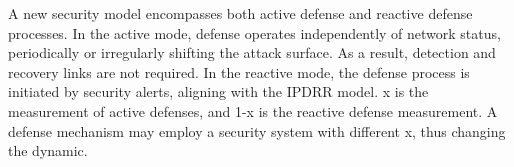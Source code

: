 A new security model encompasses both active defense and reactive defense processes. In the active mode, defense operates independently of network status, periodically or irregularly shifting the attack surface. As a result, detection and recovery links are not required. In the reactive mode, the defense process is initiated by security alerts, aligning with the IPDRR model. x is the measurement of active defenses, and 1-x is the reactive defense measurement. A defense mechanism may employ a security system with different x, thus changing the dynamic.  
